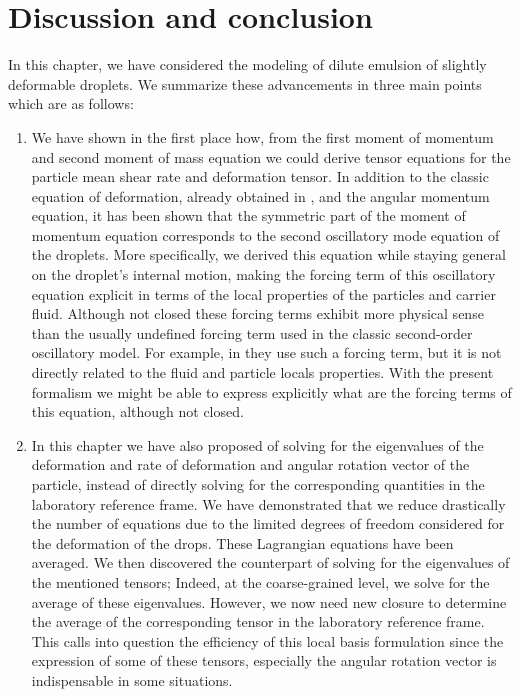 \section{Discussion and conclusion}

In this chapter, we have considered the modeling of dilute emulsion of slightly deformable droplets. 
We summarize these advancements in three main points which are as follows: 
\begin{enumerate}
    \item We have shown in the first place how, from the first moment of momentum and second moment of mass equation we could derive tensor equations for the particle mean shear rate and deformation tensor. 
In addition to the classic equation of deformation, already obtained in \citet{goddard1967nonlinear},  and the angular momentum equation, it has been shown that the symmetric part of the moment of momentum equation corresponds to the second oscillatory mode equation of the droplets. 
More specifically, we derived this equation while staying general on the droplet's internal motion, making the forcing term of this oscillatory equation explicit in terms of the local properties of the particles and carrier fluid. 
Although not closed these forcing terms exhibit more physical sense than the usually undefined forcing term used in the classic second-order oscillatory model.
For example, in \citet{riviere2021sub} they use such a forcing term, but it is not directly related to the fluid and particle locals properties.
With the present formalism we might be able to express explicitly what are the forcing terms of this equation, although not closed. 

\item 
In this chapter we have also proposed of solving for the eigenvalues of the deformation and rate of deformation and angular rotation vector of the particle, instead of directly solving for the corresponding quantities in the laboratory reference frame. 
We have demonstrated that we reduce drastically the number of equations due to the limited degrees of freedom considered for the deformation of the drops. 
These Lagrangian equations have been averaged. 
We then discovered the counterpart of solving for the eigenvalues of the mentioned tensors; 
Indeed, at the coarse-grained level, we solve for the average of these eigenvalues. 
However, we now need new closure to determine the average of the corresponding tensor in the laboratory reference frame.  
This calls into question the efficiency of this local basis formulation since the expression of some of these tensors, especially the angular rotation vector is indispensable in some situations. 


\end{enumerate}
